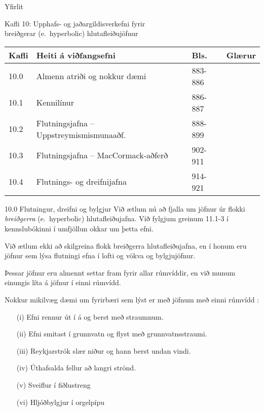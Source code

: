 \date{13.~og 18.~apríl, 2012}



\begin{frame}
	\maketitle
\end{frame}

\begin{frame}{Yfirlit}
\begin{block}{Kafli 10: Upphafs- og jaðargildisverkefni fyrir \\
  breiðgerar (e.~hyperbolic)  hlutafleiðujöfnur}
\begin{center}
\begin{tabular}{|l|l|l|l|}\hline
Kafli &Heiti á viðfangsefni &Bls. & Glærur\\
\hline
10.0 &Almenn atriði og nokkur dæmi& 883-886\\
10.1 &Kennilínur & 886-887\\
10.2 &Flutningsjafna --  Uppstreymismismunaaðf.& 888-899\\
10.3 &Flutningsjafna --  MacCormack-aðferð& 902-911\\
10.4 &Flutnings- og dreifnijafna & 914-921\\ \hline
\end{tabular}
\end{center}
\end{block}
\end{frame}


\begin{frame}{10.0  Flutningur, dreifni og bylgjur} 
Við ætlum nú að fjalla um jöfnur úr flokki {\it breiðgerra}
(e.~hyperbolic) hlutafleiðujafna.  
Við fylgjum greinum 11.1-3 í kennslubókinni í umfjöllun okkar um þetta
efni. 

\smallskip
Við ætlum ekki að skilgreina flokk breiðgerra hlutafleiðujafna, 
en í honum eru jöfnur sem lýsa flutningi efna í lofti og vökva
og bylgjujöfnur.   

\smallskip
Þessar jöfnur eru almennt settar fram 
 fyrir allar rúmvíddir, en við munum einungis
líta á jöfnur í einni rúmvídd.  

\smallskip
Nokkur mikilvæg dæmi um fyrirbæri sem lýst er með jöfnum með einni rúmvídd :
\begin{enumerate}
\item[(i)]   Efni rennur út í á og berst með straumnum.
\item[(ii)]  Efni smitast í grunnvatn og  flyst með grunnvatnsstraumi.
\item[(iii)] Reykjarstrók slær niður og hann berst undan vindi.
\item[(iv)]  Úthafsalda fellur að langri strönd.
\item[(v)]   Sveiflur í fiðlustreng
\item[(vi)]  Hljóðbylgjur í orgelpípu
\end{enumerate}
\end{frame}


